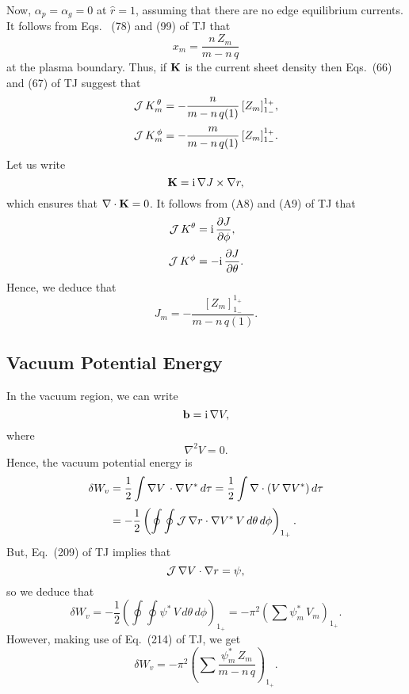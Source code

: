 \documentclass[12pt,prb,aps,notitlepage]{revtex4-1}
\begin{document}
Now, $\alpha_p=\alpha_g=0$ at $\hat{r}=1$, assuming that there are no edge equilibrium currents. It follows from Eqs.~ (78) and
(99) of TJ that 
\begin{equation}
x_m= \frac{n\,Z_m}{m-n\,q}
\end{equation}
at the plasma boundary. Thus, if ${\bf K}$ is the current sheet density then Eqs.~(66) and (67) of TJ suggest that
\begin{align}
{\cal J}\,K_m^{\,\theta} &= - \frac{n}{m-n\,q(1)}\,[Z_m]_{1_{-}}^{1_{+}},\\[0.5ex]
{\cal J}\,K_m^{\,\phi} &=-\frac{m}{m-n\,q(1)}\,[Z_m]_{1_{-}}^{1_{+}}.
\end{align}
Let us write
\begin{equation}
{\bf K} = {\rm i}\,\nabla J\times \nabla r,
\end{equation}
which ensures that $\nabla\cdot{\bf K}=0$. It follows from (A8) and (A9) of TJ that
\begin{align}
{\cal J}\,K^\theta&= {\rm i}\,\frac{\partial J}{\partial \phi},\\[0.5ex]
{\cal J}\,K^\phi &=-{\rm i}\,\frac{\partial J}{\partial\theta}.
\end{align}
Hence, we deduce that 
\begin{equation}
J_m =-\frac{[Z_m]_{1_-}^{1_+}}{m-n\,q(1)}.
\end{equation}

\subsection{Vacuum Potential Energy}
In the vacuum region, we can write
\begin{equation}
{\bf b} = {\rm i}\,\nabla V,
\end{equation}
where
\begin{equation}
\nabla^2 V =0.
\end{equation}
Hence, the vacuum potential energy is
\begin{align}
\delta W_v &= \frac{1}{2}\int \nabla V\,\cdot\nabla V^\ast\,d\tau= \frac{1}{2}\int  \nabla\cdot(V\,\nabla V^\ast)\,d\tau\nonumber\\[0.5ex]
&=-\frac{1}{2}\left(\oint\oint {\cal J}\,\nabla r\cdot\nabla V^\ast\,V\,d\theta\,d\phi\right)_{1_+} .
\end{align}
But, Eq.~(209) of TJ implies that 
\begin{equation}
{\cal J}\,\nabla V\cdot\nabla r = \psi,
\end{equation}
so we deduce that
\begin{equation}
\delta W_v = -\frac{1}{2}\left(\oint\oint \psi^\ast\,V\,d\theta\,d\phi\right)_{1_{+}} =- \pi^2\left(\sum \psi_m^\ast\,V_m\right)_{1_{+}}.
\end{equation}
However, making use of Eq.~(214) of TJ, we get
\begin{equation}
\delta W_v = - \pi^2\left(\sum \frac{\psi_m^\ast\,Z_m}{m-n\,q}\right)_{1_{+}}.
\end{equation}
\end{document}
